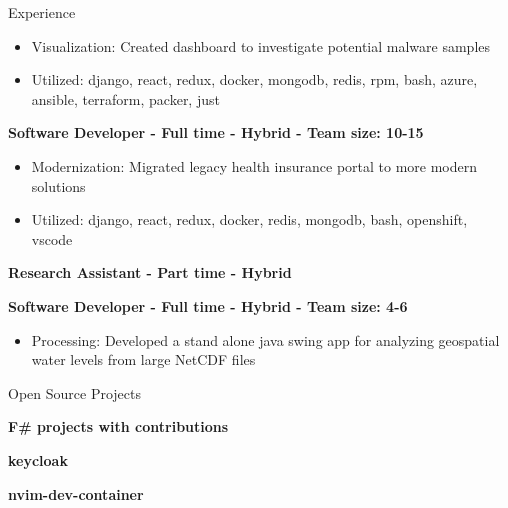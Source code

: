 \documentclass{resume} %
\begin{document}
\begin{rSection}{Experience}
\begin{itemize}
  \itemsep -2pt {}
      \item Visualization: Created dashboard to investigate potential malware samples
    \item Utilized: django, react, redux, docker, mongodb, redis, rpm, bash, azure, ansible, terraform, packer, just
\end{itemize}

\textbf{Software Developer - Full time - Hybrid - Team size: 10-15} \\

\begin{itemize}
  \itemsep -2pt {}
      \item Modernization: Migrated legacy health insurance portal to more modern solutions
    \item Utilized: django, react, redux, docker, redis, mongodb, bash, openshift, vscode
\end{itemize}

\textbf{Research Assistant - Part time - Hybrid} \\


\textbf{Software Developer - Full time - Hybrid - Team size: 4-6} \\

\begin{itemize}
  \itemsep -2pt {}
      \item Processing: Developed a stand alone java swing app for analyzing geospatial water levels from large NetCDF files
\end{itemize}

\end{rSection}


\begin{rSection}{Open Source Projects}
\vspace{-0.90em}
  \item \textbf{F\# projects with contributions} 
  \item \textbf{keycloak} 
  \item \textbf{nvim-dev-container} 
\end{rSection}
\end{document}
